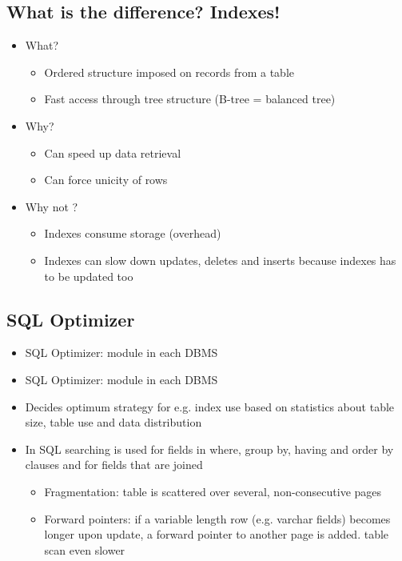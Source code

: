 \documentclass{report}
\begin{document}
    \subsection{What is the difference? Indexes!}
    \begin{itemize} 
        \item What?
            \begin{itemize} 
                \item Ordered structure imposed on records from a table
                \item Fast access through tree structure (B-tree = balanced tree)
            \end{itemize}
        \item Why?
            \begin{itemize} 
                \item Can speed up data retrieval
                \item Can force unicity of rows
            \end{itemize}
        \item Why not ?
            \begin{itemize} 
                \item Indexes consume storage (overhead)
                \item Indexes can slow down updates, deletes and inserts because indexes has to be updated too
            \end{itemize}
    \end{itemize}
    \subsection{SQL Optimizer}
        \begin{itemize} 
            \item SQL Optimizer: module in each DBMS
            \item SQL Optimizer: module in each DBMS
            \item Decides optimum strategy for e.g. index use based on statistics about table size, table use and data distribution
            \item In SQL searching is used for fields in where, group by, having and order by clauses and for fields that are joined
            \begin{itemize} 
                \item Fragmentation: table is scattered over several, non-consecutive pages
                \item Forward pointers: if a variable length row (e.g. varchar fields) becomes longer upon update, a forward pointer to another page is added. \textrightarrow table scan even slower
            \end{itemize}
        \end{itemize}
\end{document}
